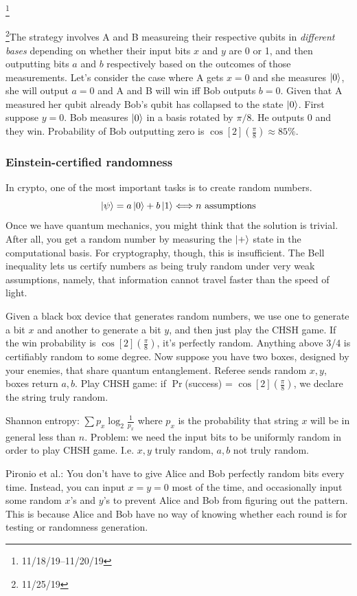 \documentclass[12pt]{article}
\begin{document}
\footnote{11/18/19--11/20/19}

\footnote{11/25/19}The strategy involves A and B measureing their respective
qubits in \emph{different bases} depending on whether their input bits $x$ and
$y$ are 0 or 1, and then outputting bits $a$ and $b$ respectively based on the
outcomes of those measurements. Let's consider the case where A gets $x=0$ and
she measures $\ket{0}$, she will output $a=0$ and A and B will win iff Bob
outputs $b=0$. Given that A measured her qubit already Bob's qubit has
collapsed to the state $\ket{0}$. First suppose $y=0$. Bob measures $\ket{0}$
in a basis rotated by $\pi/8$. He outputs 0 and they win. Probability of Bob
outputting zero is $\cos[2](\frac{\pi}{8}) \approx 85\%$.

\subsubsection{Einstein-certified randomness}
In crypto, one of the most important tasks is to create random numbers.
\[\ket\psi = a \ket 0 + b \ket 1 \Longleftrightarrow n \text{ assumptions}\]
Once we have quantum mechanics, you might think that the solution is trivial.
After all, you get a random number by measuring the $\ket +$ state in the
computational basis. For cryptography, though, this is insufficient. The Bell
inequality lets us certify numbers as being truly random under very weak
assumptions, namely, that information cannot travel faster than the speed of
light.

Given a black box device that generates random numbers, we use one to generate
a bit $x$ and another to generate a bit $y$, and then just play the CHSH game.
If the win probability is $\cos[2](\frac{\pi}{8})$, it's perfectly random.
Anything above 3/4 is certifiably random to some degree. Now suppose you have
two boxes, designed by your enemies, that share quantum entanglement. Referee
sends random $x,y$, boxes return $a,b$. Play CHSH game: if $\Pr$(success) =
$\cos[2](\frac{\pi}{8})$, we declare the string truly random.

Shannon entropy: $\displaystyle \sum p_x \log_2 \frac{1}{p_x}$ where $p_x$ is
the probability that string $x$ will be in general less than $n$. Problem: we
need the input bits to be uniformly random in order to play CHSH game. I.e.
$x,y$ truly random, $a,b$ not truly random.

Pironio et al.: You don't have to give Alice and Bob perfectly random
bits every time. Instead, you can input $x=y=0$ most of the time, and
occasionally input some random $x$'s and $y$'s to prevent Alice and Bob
from figuring out the pattern. This is because Alice and Bob have no
way of knowing whether each round is for testing or randomness
generation.
\end{document}
